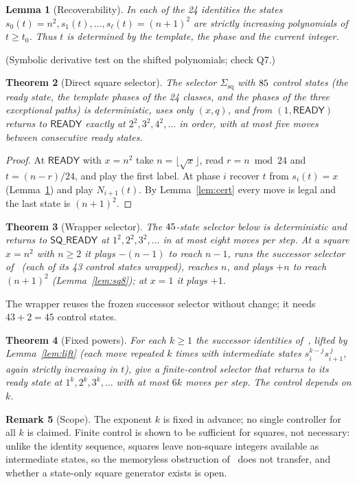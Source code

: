 \documentclass[11pt]{article}
\newtheorem{theorem}{Theorem}[section]
\newtheorem{lemma}[theorem]{Lemma}
\theoremstyle{definition}
\newtheorem{remark}[theorem]{Remark}
\newcommand{\RDY}{\mathsf{READY}}
\begin{document}
\begin{lemma}[Recoverability]\label{lem:recover}
In each of the 24 identities the states $s_0(t)=n^2,s_1(t),\dots,s_\ell(t)=(n+1)^2$ are strictly increasing polynomials of $t\ge t_0$. Thus $t$ is determined by the template, the phase and the current integer.
\end{lemma}
(Symbolic derivative test on the shifted polynomials; check Q7.)

\begin{theorem}[Direct square selector]\label{thm:direct}
The selector $\Sigma_{\mathrm{sq}}$ with $85$ control states (the ready state, the template phases of the 24 classes, and the phases of the three exceptional paths) is deterministic, uses only $(x,q)$, and from $(1,\RDY)$ returns to $\RDY$ exactly at
$2^2,3^2,4^2,\dots$ in order, with at most five moves between consecutive ready states.
\end{theorem}
\begin{proof} At $\RDY$ with $x=n^2$ take $n=\lfloor\sqrt x\rfloor$, read $r=n\bmod24$ and $t=(n-r)/24$, and play the first label. At phase $i$ recover $t$ from $s_i(t)=x$ (Lemma~\ref{lem:recover}) and play $N_{i+1}(t)$. By Lemma~\ref{lem:cert} every move is legal and the last state is $(n+1)^2$. \end{proof}

\begin{theorem}[Wrapper selector]\label{thm:wrap}
The $45$-state selector below is deterministic and returns to $\mathsf{SQ\_READY}$ at $1^2,2^2,3^2,\dots$ in at most eight moves per step. At a square $x=n^2$ with $n\ge2$ it plays $-(n-1)$ to reach $n-1$, runs the successor selector of~\cite{u2} (each of its 43 control states wrapped), reaches $n$, and plays $+n$ to reach $(n+1)^2$ (Lemma~\ref{lem:sq8}); at $x=1$ it plays $+1$.
\end{theorem}
The wrapper reuses the frozen successor selector without change; it needs $43+2=45$ control states.

\begin{theorem}[Fixed powers]\label{thm:powers}
For each $k\ge1$ the successor identities of~\cite{u1bnd}, lifted by Lemma~\ref{lem:lift} (each move repeated $k$ times with intermediate states $s_i^{k-j}s_{i+1}^{\,j}$, again strictly increasing in $t$), give a finite-control selector that returns to its ready state at $1^k,2^k,3^k,\dots$ with at most $6k$ moves per step. The control depends on $k$.
\end{theorem}
\begin{center}\end{center}
\begin{remark}[Scope]
The exponent $k$ is fixed in advance; no single controller for all $k$ is claimed. Finite control is shown to be sufficient for squares, not necessary: unlike the identity sequence, squares leave non-square integers available as intermediate states, so the memoryless obstruction of~\cite{u2} does not transfer, and whether a state-only square generator exists is open.
\end{remark}
\end{document}
